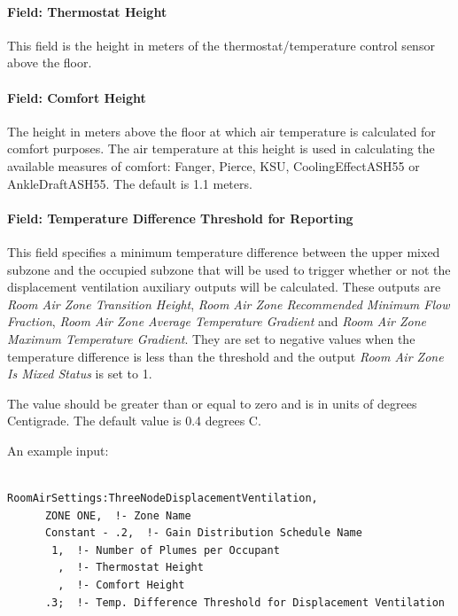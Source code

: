 \paragraph{Field: Thermostat Height}\label{field-thermostat-height-1}

This field is the height in meters of the thermostat/temperature control sensor above the floor.

\paragraph{Field: Comfort Height}\label{field-comfort-height}

The height in meters above the floor at which air temperature is calculated for comfort purposes. The air temperature at this height is used in calculating the available measures of comfort: Fanger, Pierce, KSU, CoolingEffectASH55 or AnkleDraftASH55. The default is 1.1 meters.

\paragraph{Field: Temperature Difference Threshold for Reporting}\label{field-temperature-difference-threshold-for-reporting}

This field specifies a minimum temperature difference between the upper mixed subzone and the occupied subzone that will be used to trigger whether or not the displacement ventilation auxiliary outputs will be calculated. These outputs are \emph{Room Air Zone Transition Height}, \emph{Room Air Zone Recommended Minimum Flow Fraction}, \emph{Room Air Zone Average Temperature Gradient} and \emph{Room Air Zone Maximum Temperature Gradient}. They are set to negative values when the temperature difference is less than the threshold and the output \emph{Room Air Zone Is Mixed Status} is set to 1.

The value should be greater than or equal to zero and is in units of degrees Centigrade. The default value is 0.4 degrees C.

An example input:

\begin{lstlisting}

RoomAirSettings:ThreeNodeDisplacementVentilation,
      ZONE ONE,  !- Zone Name
      Constant - .2,  !- Gain Distribution Schedule Name
       1,  !- Number of Plumes per Occupant
        ,  !- Thermostat Height
        ,  !- Comfort Height
      .3;  !- Temp. Difference Threshold for Displacement Ventilation
\end{lstlisting}

